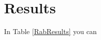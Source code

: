 \documentclass{article}[11 pt]
\begin{document}
\section{Results}
In Table \ref{RabResults} you can 
% 			
\end{document}
